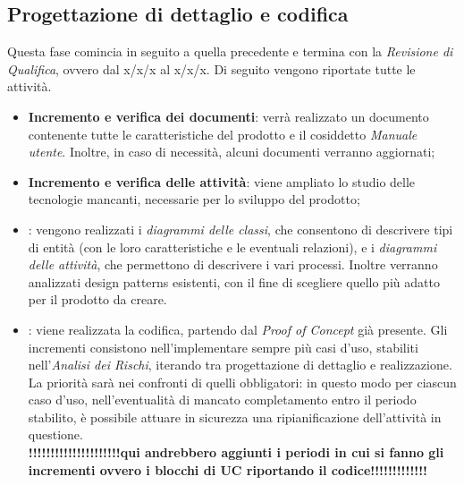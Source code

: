 \subsection{Progettazione di dettaglio e codifica}
Questa fase comincia in seguito a quella precedente e termina con la \textit{Revisione di Qualifica}, ovvero dal x/x/x al x/x/x. Di seguito vengono riportate tutte le attività.

\begin{itemize}
	\item \textbf{Incremento e verifica dei documenti}: verrà realizzato un documento contenente tutte le caratteristiche del prodotto e il cosiddetto \textit{Manuale utente}. Inoltre, in caso di necessità, alcuni documenti verranno aggiornati;
	\item \textbf{Incremento e verifica delle attività}: viene ampliato lo studio delle tecnologie mancanti, necessarie per lo sviluppo del prodotto; 
	\item \textbf{}: vengono realizzati i \textit{diagrammi delle classi}, che consentono di descrivere tipi di entità (con le loro caratteristiche e le eventuali relazioni), e i \textit{diagrammi delle attività}, che permettono di descrivere i vari processi. Inoltre verranno analizzati design patterns esistenti, con il fine di scegliere quello più adatto per il prodotto da creare.
	\item \textbf{}: viene realizzata la codifica, partendo dal \textit{Proof of Concept} già presente. Gli incrementi consistono nell'implementare sempre più casi d'uso, stabiliti nell'\textit{Analisi dei Rischi}, iterando tra progettazione di dettaglio e realizzazione. La priorità sarà nei confronti di quelli obbligatori: in questo modo per ciascun caso d'uso, nell'eventualità di mancato completamento entro il periodo stabilito, è possibile attuare in sicurezza una ripianificazione dell'attività in questione. \\
\textbf{!!!!!!!!!!!!!!!!!!!!!qui andrebbero aggiunti i periodi in cui si fanno gli incrementi ovvero i blocchi di UC riportando il codice!!!!!!!!!!!!!}
\end{itemize}

